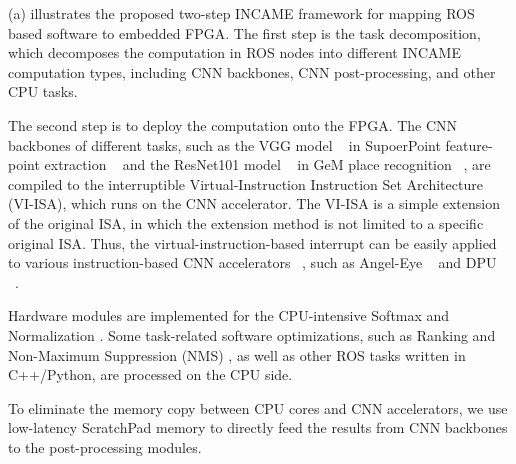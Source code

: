 
(a) illustrates the proposed two-step INCAME framework for mapping ROS based software to embedded FPGA.
The first step is the task decomposition, which decomposes the computation in ROS nodes into different INCAME computation types, including CNN backbones, CNN post-processing, and other CPU tasks. 

The second step is to deploy the computation onto the FPGA. 
The CNN backbones of different tasks, such as the VGG model  ~\cite{kim2016accurate} in SupoerPoint feature-point extraction  ~\cite{detone2018superpoint} and the ResNet101 model  ~\cite{he2016deep} in GeM place recognition  ~\cite{radenovic2018fine}, are compiled to the interruptible Virtual-Instruction Instruction Set Architecture (VI-ISA), which runs on the CNN accelerator. The VI-ISA is a simple extension of the original ISA, in which the extension method is not limited to a specific original ISA. Thus, the virtual-instruction-based interrupt can be easily applied to various instruction-based CNN accelerators  ~\cite{yu2018instruction,qiu2016going}, such as Angel-Eye ~\cite{guo2017angel} and DPU ~\cite{dpu}.

Hardware modules are implemented for the CPU-intensive Softmax  \cite{Softmax-wiki} and Normalization  \cite{Norm}. Some task-related software optimizations, such as Ranking and Non-Maximum Suppression (NMS)  \cite{NeubeckGool-NMS}, as well as other ROS tasks written in C++/Python, are processed on the CPU side.

To eliminate the memory copy between CPU cores and CNN accelerators, we use low-latency ScratchPad memory  \cite{Banakar2002Scratchpad} to directly feed the results from CNN backbones to the post-processing modules. 

